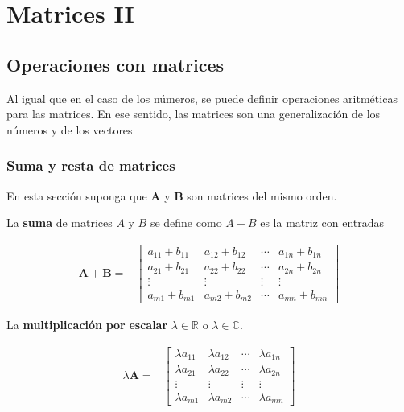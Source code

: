 \documentclass[
]{article}
\begin{document}
\hypertarget{matrices-ii}{%
\section{\texorpdfstring{\textbf{Matrices}
II}{Matrices II}}\label{matrices-ii}}

\small

\hypertarget{operaciones-con-matrices}{%
\subsection{Operaciones con matrices}\label{operaciones-con-matrices}}

Al igual que en el caso de los números, se puede definir operaciones
aritméticas para las matrices. En ese sentido, las matrices son una
generalización de los números y de los vectores

\hypertarget{suma-y-resta-de-matrices}{%
\subsubsection{Suma y resta de
matrices}\label{suma-y-resta-de-matrices}}

En esta sección suponga que \(\mathbf{A}\) y \(\mathbf{B}\) son matrices
del mismo orden.

La \textbf{suma} de matrices \(A\) y \(B\) se define como \(A+B\) es la
matriz con entradas

\begin{equation*}
\begin{array}{cc}
\mathbf{A} + \mathbf{B}   = & 
      \begin{bmatrix}
              a_{11}+b_{11}  & a_{12}+b_{12}  & \cdots   & a_{1n}+b_{1n}   \\
              a_{21}+b_{21}  & a_{22}+b_{22}  & \cdots   & a_{2n}+b_{2n} \\
              \vdots   & \vdots  & \vdots   & \vdots \\
              a_{m1}+b_{m1}  & a_{m2}+b_{m2}  & \cdots   & a_{mn}+b_{mn} 
        \end{bmatrix}
\end{array}
\end{equation*}

La \textbf{multiplicación} \textbf{por} \textbf{escalar}
\(\lambda \in\mathbb{R}\) o \(\lambda\in\mathbb{C}\).

\begin{equation*}
\begin{array}{cc}
\lambda \mathbf{A}    = & 
      \begin{bmatrix}
              \lambda a_{11}  & \lambda a_{12}  & \cdots   & \lambda a_{1n}   \\
              \lambda a_{21}  & \lambda a_{22}  & \cdots   & \lambda a_{2n} \\
              \vdots  & \vdots  & \vdots   & \vdots \\
              \lambda a_{m1}  & \lambda a_{m2}  & \cdots   & \lambda a_{mn} 
        \end{bmatrix}
\end{array}
\end{equation*}
\end{document}
